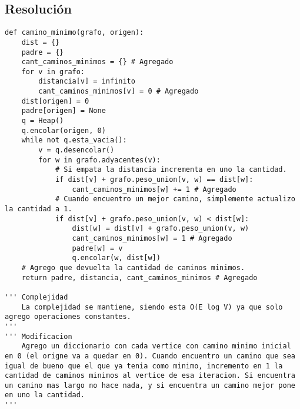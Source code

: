 \documentclass{article}
\begin{document}
\subsection*{Resolución}
\begin{lstlisting}[frame=single]
def camino_minimo(grafo, origen):
    dist = {}
    padre = {}
    cant_caminos_minimos = {} # Agregado
    for v in grafo:
        distancia[v] = infinito
        cant_caminos_minimos[v] = 0 # Agregado
    dist[origen] = 0
    padre[origen] = None
    q = Heap()
    q.encolar(origen, 0)
    while not q.esta_vacia():
        v = q.desencolar()
        for w in grafo.adyacentes(v):
            # Si empata la distancia incrementa en uno la cantidad.
            if dist[v] + grafo.peso_union(v, w) == dist[w]:
                cant_caminos_minimos[w] += 1 # Agregado
            # Cuando encuentro un mejor camino, simplemente actualizo la cantidad a 1.
            if dist[v] + grafo.peso_union(v, w) < dist[w]:
                dist[w] = dist[v] + grafo.peso_union(v, w)
                cant_caminos_minimos[w] = 1 # Agregado
                padre[w] = v
                q.encolar(w, dist[w])
    # Agrego que devuelta la cantidad de caminos minimos.
    return padre, distancia, cant_caminos_minimos # Agregado

''' Complejidad
    La complejidad se mantiene, siendo esta O(E log V) ya que solo agrego operaciones constantes.
'''
''' Modificacion
    Agrego un diccionario con cada vertice con camino minimo inicial en 0 (el origne va a quedar en 0). Cuando encuentro un camino que sea igual de bueno que el que ya tenia como minimo, incremento en 1 la cantidad de caminos minimos al vertice de esa iteracion. Si encuentra un camino mas largo no hace nada, y si encuentra un camino mejor pone en uno la cantidad.
'''
\end{lstlisting}
\end{document}
